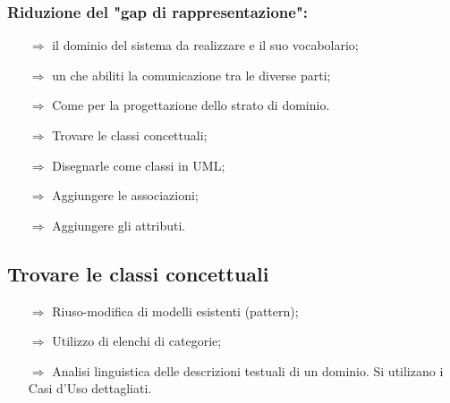 

\subsubsection{Riduzione del "gap di rappresentazione":}

\begin{itemize}
    \item [$\Rightarrow$]  il dominio del sistema da realizzare e il suo vocabolario;
    \item [$\Rightarrow$]  un  che abiliti la comunicazione tra le diverse parti;
    \item [$\Rightarrow$] Come  per la progettazione dello strato di dominio.
\end{itemize}


\begin{itemize}
    \item [$\Rightarrow$] Trovare le classi concettuali;
    \item [$\Rightarrow$] Disegnarle come classi in UML;
    \item [$\Rightarrow$] Aggiungere le associazioni;
    \item [$\Rightarrow$] Aggiungere gli attributi.
\end{itemize}

\subsection{Trovare le classi concettuali}

\begin{itemize}
    \item [$\Rightarrow$] Riuso-modifica di modelli esistenti (pattern);
    \item [$\Rightarrow$] Utilizzo di elenchi di categorie;
    \item [$\Rightarrow$] Analisi linguistica delle descrizioni testuali di un dominio. 
    Si utilizano i Casi d'Uso dettagliati.
\end{itemize}

